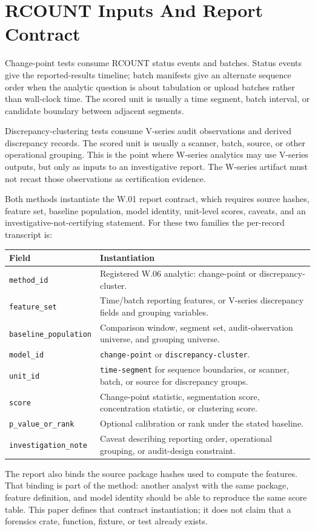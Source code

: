 \section{RCOUNT Inputs And Report Contract}

Change-point tests consume RCOUNT status events and batches. Status events give
the reported-results timeline; batch manifests give an alternate sequence order
when the analytic question is about tabulation or upload batches rather than
wall-clock time. The scored unit is usually a time segment, batch interval, or
candidate boundary between adjacent segments.

Discrepancy-clustering tests consume V-series audit observations and derived
discrepancy records. The scored unit is usually a scanner, batch, source, or
other operational grouping. This is the point where W-series analytics may use
V-series outputs, but only as inputs to an investigative report. The W-series
artifact must not recast those observations as certification evidence.

Both methods instantiate the W.01 report contract, which requires source hashes,
feature set, baseline population, model identity, unit-level scores, caveats,
and an investigative-not-certifying statement. For these two families the
per-record transcript is:

\begin{center}
\small
\begin{tabularx}{\textwidth}{lX}
\toprule
Field & Instantiation \\
\midrule
\texttt{method\_id} & Registered W.06 analytic: change-point or discrepancy-cluster. \\
\texttt{feature\_set} & Time/batch reporting features, or V-series discrepancy fields and grouping variables. \\
\texttt{baseline\_population} & Comparison window, segment set, audit-observation universe, and grouping universe. \\
\texttt{model\_id} & \texttt{change-point} or \texttt{discrepancy-cluster}. \\
\texttt{unit\_id} & \texttt{time-segment} for sequence boundaries, or scanner, batch, or source for discrepancy groups. \\
\texttt{score} & Change-point statistic, segmentation score, concentration statistic, or clustering score. \\
\texttt{p\_value\_or\_rank} & Optional calibration or rank under the stated baseline. \\
\texttt{investigation\_note} & Caveat describing reporting order, operational grouping, or audit-design constraint. \\
\bottomrule
\end{tabularx}
\end{center}

The report also binds the source package hashes used to compute the features.
That binding is part of the method: another analyst with the same package,
feature definition, and model identity should be able to reproduce the same
score table. This paper defines that contract instantiation; it does not claim
that a forensics crate, function, fixture, or test already exists.

